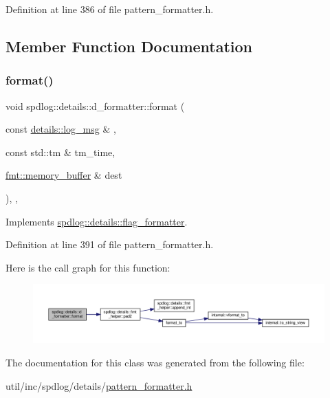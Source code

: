 Definition at line 386 of file pattern\+\_\+formatter.\+h.



\subsection{Member Function Documentation}
\mbox{\label{classspdlog_1_1details_1_1d__formatter_ad1c7decfd7bfa7ecd6fd105e2d74bed4}} 
\subsubsection{\texorpdfstring{format()}{format()}}
{\footnotesize\ttfamily void spdlog\+::details\+::d\+\_\+formatter\+::format (\begin{DoxyParamCaption}\item[{const \hyperlink{structspdlog_1_1details_1_1log__msg}{details\+::log\+\_\+msg} \&}]{,  }\item[{const std\+::tm \&}]{tm\+\_\+time,  }\item[{\hyperlink{format_8h_a21cbf729f69302f578e6db21c5e9e0d2}{fmt\+::memory\+\_\+buffer} \&}]{dest }\end{DoxyParamCaption})\hspace{0.3cm}{\ttfamily [inline]}, {\ttfamily [override]}, {\ttfamily [virtual]}}



Implements \hyperlink{classspdlog_1_1details_1_1flag__formatter_a33fb3e42a4c8200cceb833d92b53fb67}{spdlog\+::details\+::flag\+\_\+formatter}.



Definition at line 391 of file pattern\+\_\+formatter.\+h.

Here is the call graph for this function\+:
\nopagebreak
\begin{figure}[H]
\begin{center}
\leavevmode
\includegraphics[width=350pt]{classspdlog_1_1details_1_1d__formatter_ad1c7decfd7bfa7ecd6fd105e2d74bed4_cgraph}
\end{center}
\end{figure}


The documentation for this class was generated from the following file\+:\begin{DoxyCompactItemize}
\item 
util/inc/spdlog/details/\hyperlink{pattern__formatter_8h}{pattern\+\_\+formatter.\+h}\end{DoxyCompactItemize}
